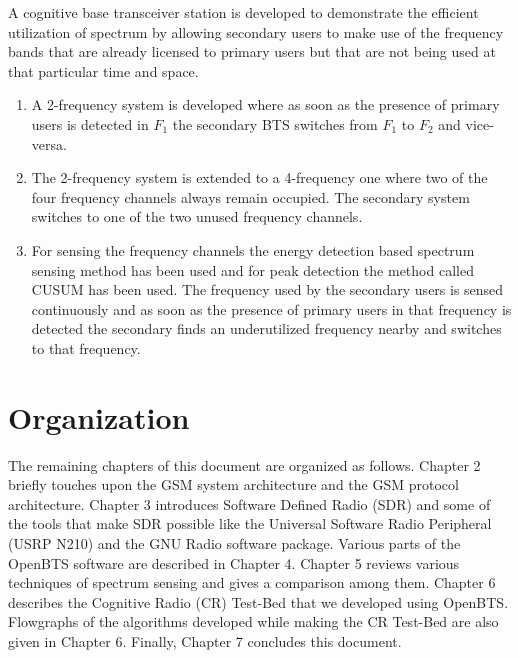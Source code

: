 A cognitive base transceiver station is developed to demonstrate the efficient 
utilization of spectrum by allowing secondary users to make use of the 
frequency bands that are already licensed to primary users but that are not 
being used at that particular time and space.

\begin{enumerate}
    \item A 2-frequency system is developed where as soon as the presence of 
    primary users is detected in $F_1$  the secondary BTS switches from $F_1$ 
    to $F_2$ and vice-versa.
    \item The 2-frequency system is extended to a 4-frequency one where
    two of the four frequency channels always remain occupied. The secondary
    system switches to one of the two unused frequency channels.
    \item For sensing the frequency channels the energy detection based
    spectrum sensing method has been used and for peak detection the method 
    called CUSUM has been used. The frequency used by the secondary users is
    sensed continuously and as soon as the presence of primary users in that 
    frequency is detected the secondary finds an underutilized frequency 
    nearby and switches to that frequency.  
\end{enumerate}



\section{Organization}
The remaining chapters of this document are organized as follows. Chapter 2 
briefly touches upon the GSM system architecture and the GSM protocol 
architecture. Chapter 3 introduces Software Defined Radio (SDR) and some of the
tools that make SDR possible like the Universal Software Radio Peripheral 
(USRP N210) and the GNU Radio software package. Various parts of the OpenBTS 
software are described in Chapter 4. Chapter 5 reviews various techniques of 
spectrum sensing and gives a comparison among them. Chapter 6 describes the 
Cognitive Radio (CR) Test-Bed that we developed using OpenBTS. Flowgraphs of
the algorithms developed while making the CR Test-Bed are also given in
Chapter 6. Finally, Chapter 7 concludes this document.

